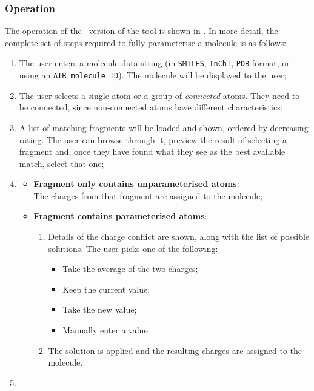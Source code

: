 \subsubsection{Operation}
The operation of the \IDa\ version of the tool is shown in . In more detail, the complete set of steps required to fully parameterise a molecule is as follows:
\begin{enumerate}[itemsep=.1em, parsep=.2em, topsep=0em]
\item The user enters a molecule data string (in \verb|SMILES|, \verb|InChI|, \verb|PDB| format, or using an \verb|ATB molecule ID|). The molecule will be displayed to the user;
\item The user selects a single atom or a group of \emph{connected} atoms. They need to be connected, since non-connected atoms have different characteristics;
\item A list of matching fragments will be loaded and shown, ordered by decreasing rating. The user can browse through it, preview the result of selecting a fragment and, once they have found what they see as the best available match, select that one;
\item
  \begin{itemize}[leftmargin=0cm, itemsep=.1em, parsep=.1em]
  \item[] {\bf Fragment only contains unparameterised atoms}:\\
    The charges from that fragment are assigned to the molecule;
  \item[]{\bf Fragment contains parameterised atoms}:
    \begin{enumerate}
    \item
      Details of the charge conflict are shown, along with the list of possible solutions. The user picks one of the following:
      \begin{itemize}[itemsep=.1em, parsep=.2em, topsep=0em]
      \item Take the average of the two charges;
      \item Keep the current value;
      \item Take the new value;
      \item Manually enter a value.
      \end{itemize}
    \item The solution is applied and the resulting charges are assigned to the molecule.
    \end{enumerate}
  \end{itemize}
\item

\end{enumerate}
